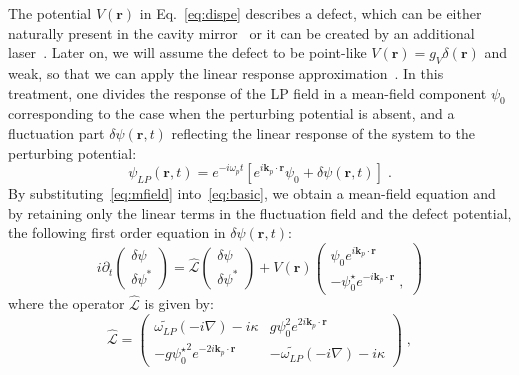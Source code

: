 The potential $V(\bm{r})$ in Eq.~\eqref{eq:dispe} describes a
defect, which can be either naturally present in the cavity
mirror~\cite{Amo_2009} or it can be created by an additional
laser~\cite{Amo_2010}. Later on, we will assume the defect to be
point-like $V(\bm{r})=g_V \delta(\bm{r})$ and weak, so that we can
apply the linear response approximation~\cite{Astrakharchik_2004}.
%
In this treatment, one divides the response of the LP field in a
mean-field component $\psi_0$ corresponding to the case when the
perturbing potential is absent, and a fluctuation part $\delta \psi
(\bm{r},t)$ reflecting the linear response of the system to the
perturbing potential:
%
\begin{equation}
  \psi_{LP} (\bm{r},t) = e^{-i \omega_p t} \left[e^{i \bm{k}_p
      \cdot \bm{r}} \psi_0 + \delta \psi (\bm{r},t)\right] \; .
\label{eq:mfield}
\end{equation}
%
%
By substituting~\eqref{eq:mfield} into~\eqref{eq:basic}, we obtain a
mean-field equation and by retaining only the linear terms in the
fluctuation field and the defect potential, the following first order
equation in $\delta \psi (\bm{r},t)$:
%
\begin{equation}
  i \partial_t \begin{pmatrix} \delta \psi \\ \delta
    \psi^* \end{pmatrix} = \hat{\mathcal{L}} \begin{pmatrix} \delta
    \psi \\ \delta \psi^* \end{pmatrix} + V(\bm{r}) \begin{pmatrix}
    \psi_0 e^{i \bm{k}_p \cdot \bm{r}} \\ -\psi_0^{\star} e^{-i
      \bm{k}_p \cdot \bm{r}}\; ,
    \end{pmatrix}
\label{eq:linre}
\end{equation}
%
where the operator $\hat{\mathcal{L}}$ is given by:
%
\begin{equation}
 \hat{\mathcal{L}} = \begin{pmatrix} \widetilde{\omega_{LP}}
   (-i\nabla) - i \kappa & g \psi_0^2 e^{2 i \bm{k}_p \cdot
     \bm{r}} \\ -g {\psi_0^{\star}}^2 e^{-2 i \bm{k}_p \cdot
     \bm{r}}& - \widetilde{\omega_{LP}}(-i \nabla) -
   i\kappa \end{pmatrix}\; ,
\end{equation}
